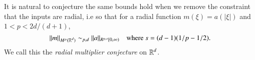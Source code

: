 %



It is natural to conjecture the same bounds hold when we remove the constraint that the inputs are radial, i.e so that for a radial function $m(\xi) = a(|\xi|)$ and $1 < p < 2d/(d+1)$,
\begin{equation} \label{RadialMultiplierBound}
  \| m \|_{M^p(\operatorname{\mathbb{R}}^d)} \sim_{p,d} \| a \|_{R^{p,s}[0,\infty)} \quad\text{where $s = (d-1)(1/p - 1/2)$}.
\end{equation}
%
%
%
We call this the \emph{radial multiplier conjecture} on $\operatorname{\mathbb{R}}^d$.

